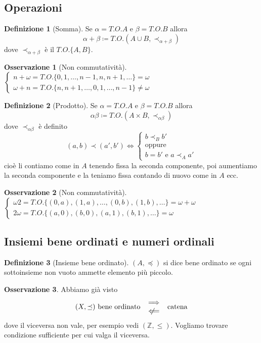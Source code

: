 \documentclass[a4paper,10pt]{article}
\theoremstyle{definition}
\newcommand{\za}{\mathbb{Z}} %
\newcommand{\notimpliedby}{\mathrel{{\ooalign{\hidewidth$\not\phantom{=}$\hidewidth\cr$\impliedby$}}}}  %
\theoremstyle{indentdefinition}
\newtheorem{defn}{Definizione}[section]
\theoremstyle{indentpostulate}
\theoremstyle{indenttheorem}
\theoremstyle{myremark}
\newtheorem*{rem*}{Osservazione}
\theoremstyle{indentgeneral}
\begin{document}
\subsection{Operazioni}
\begin{defn}[Somma]
    Se $\alpha=T.O.{A}$ e $\beta=T.O.{B}$ allora $$\alpha+\beta\coloneqq T.O.(A\cup B,\prec_{\alpha+\beta})$$ dove $\prec_{\alpha+\beta}$ è il $T.O.\{A,B\}$.
\end{defn}

\begin{rem*}[Non commutatività]
    $\begin{cases}
        n+\omega=T.O.\{0,1,\dots,n-1,n,n+1,\dots\}=\omega\\
        \omega+n=T.O.\{n,n+1,\dots,0,1,\dots,n-1\}\ne\omega
    \end{cases}$
\end{rem*}

\begin{defn}[Prodotto]
    Se $\alpha=T.O.{A}$ e $\beta=T.O.{B}$ allora $$\alpha\beta\coloneqq T.O.(A\times B,\prec_{\alpha\beta})$$ dove $\prec_{\alpha\beta}$ è definito
    $$(a,b)\prec(a',b')\iff \begin{cases}
        b\prec_B b' \\
        \text{oppure}\\
        b=b' \text{ e }a\prec_Aa'
    \end{cases}$$
    cioè li contiamo come in $A$ tenendo fissa la seconda componente, poi aumentiamo la seconda componente e la teniamo fissa contando di nuovo come in $A$ ecc.
\end{defn}

\begin{rem*}[Non commutatività]
    $\begin{cases}
        \omega2=T.O.\{(0,a),(1,a),\dots,(0,b),(1,b),\dots\}=\omega+\omega\\
        2\omega=T.O.\{(a,0),(b,0),(a,1),(b,1),\dots\}=\omega
    \end{cases}$
\end{rem*}

\subsection{Insiemi bene ordinati e numeri ordinali}
\begin{defn}[Insieme bene ordinato] $(A,\preceq)$ si dice bene ordinato se ogni sottoinsieme non vuoto ammette elemento più piccolo.
\end{defn}
\begin{rem*}
    Abbiamo già visto  $$(X,\preceq) \text{ bene ordinato }\begin{array}{c}
         \implies  \\
         \notimpliedby 
    \end{array} \text{ catena}$$
    dove il viceversa non vale, per esempio vedi $(\za,\le)$. Vogliamo trovare condizione sufficiente per cui valga il viceversa.
\end{rem*}
\end{document}
